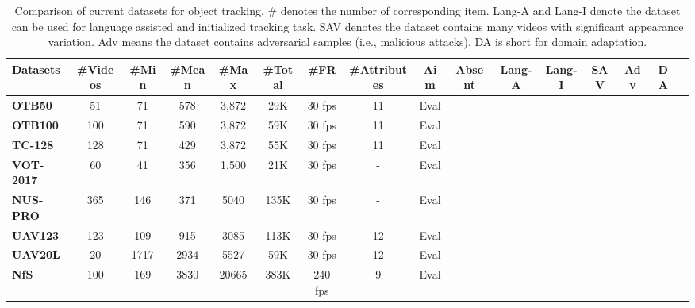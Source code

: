 \documentclass[final]{cvpr}
\begin{document}
\begin{table*}[htp]
\center
\scriptsize 
\caption{Comparison of current datasets for object tracking. $\#$ denotes the number of corresponding item. Lang-A and Lang-I denote the dataset can be used for language assisted and initialized tracking task. SAV denotes the dataset contains many videos with significant appearance variation. Adv means the dataset contains adversarial samples (i.e., malicious attacks). DA is short for domain adaptation.} \label{benchmarkList}
\begin{tabular}{l|ccccccccccccccc}
\hline \toprule [0.8 pt]
\textbf{Datasets}    &\textbf{\#Videos}  &\textbf{\#Min} &\textbf{\#Mean} &\textbf{\#Max} &\textbf{\#Total} &\textbf{\#FR}  &\textbf{\#Attributes} &\textbf{Aim} &\textbf{Absent} &\textbf{Lang-A} &\textbf{Lang-I} & \textbf{SAV}      &\textbf{Adv}   &\textbf{DA} \\ 
\hline
\textbf{OTB50 \cite{Wu2013Online}}   	    &51       &71 	&578    &3,872    &29K    &30 fps      &11    &Eval      &       &     &           &             &          &           \\
\textbf{OTB100 \cite{wu2015object}}   	&100     &71  	&590    &3,872    &59K    &30 fps     &11    &Eval    &      &         &           &          &         &            \\
\textbf{TC-128 \cite{Liang2015Encoding}}   	    &128     &71  	&429    &3,872    &55K    &30 fps       &11    &Eval     &    &      &            &         &            &             \\
\textbf{VOT-2017 \cite{VOT_TPAMI}}   &60      &41  	&356    &1,500    &21K    &30 fps     &-    &Eval    &       &     &     &                 &             &          \\
\textbf{NUS-PRO \cite{nus_pro}}   	&365     &146  	&371    &5040    &135K    &30 fps      &-    &Eval    &       &      &          &            &          &            \\
\textbf{UAV123 \cite{mueller2016benchmarkuav20l}}   	&123     &109  	&915    &3085    &113K    &30 fps         &12    &Eval    &       &      &     &            &               &            \\
\textbf{UAV20L \cite{mueller2016benchmarkuav20l}}   	&20     &1717  	&2934    &5527    &59K    &30 fps          &12    		&Eval    &       &       &  &           &              &                \\
\textbf{NfS \cite{kiani2017Nfs}}   	            &100     &169  	&3830    &20665    &383K    &240 fps           &9    &Eval    &       &         &      &            &          &             \\

\end{tabular}
\end{table*}
\end{document}
